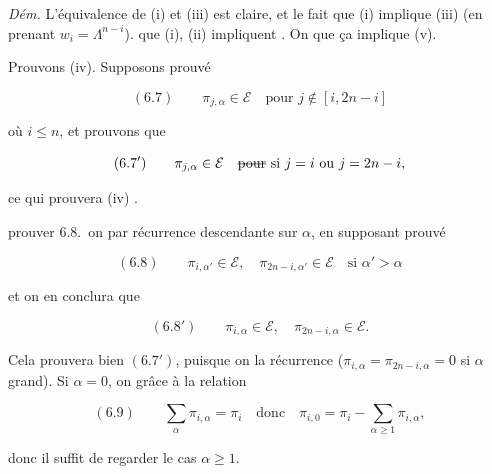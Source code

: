 \documentclass[11pt,a4paper]{article}
\begin{document}

\emph{Dém.} L'équivalence de (i) et (iii) est claire, et le fait que
(i) implique (iii) (en prenant $w_{i} = \Lambda^{n-i}$). %
 que (i), (ii) impliquent \ill{}. On \struck{\ill{}}
 que ça implique (v).


Prouvons (iv). Supposons prouvé

\[ (6.7) \qquad \pi_{j,\alpha} \in \mathcal{E} \quad \text{pour } j \notin [i, 2n-i] \]

où $i \leqslant n$, et prouvons que

\[ (6.7') \qquad \pi_{j,\alpha} \in \mathcal{E} \quad \text{\struck{pour} si } j = i \text{ ou } j = 2n-i , \]

ce qui prouvera (iv) .


 prouver 6.8.\ on  par récurrence
 descendante sur $\alpha$, en supposant prouvé

\[ (6.8) \qquad \pi_{i,\alpha'} \in \mathcal{E}, \quad \pi_{2n-i,\alpha'} \in \mathcal{E} \quad \text{si } \alpha' > \alpha \]

et on en conclura que

\[ (6.8') \qquad \pi_{i,\alpha} \in \mathcal{E}, \quad \pi_{2n-i,\alpha} \in \mathcal{E} . \]

Cela \struck{\ill{}} prouvera bien $(6.7')$, puisque on  la récurrence ($\pi_{i,\alpha} = \pi_{2n-i,\alpha} = 0$ si $\alpha$
grand). Si $\alpha = 0$, on  grâce à la relation

\[ (6.9) \qquad \sum_{\alpha} \pi_{i,\alpha} = \pi_{i} \quad \text{donc} \quad \pi_{i,0} = \pi_{i} - \sum_{\alpha \geqslant 1} \pi_{i,\alpha} , \]

donc il suffit de regarder le cas $\alpha \geqslant 1$.
\end{document}
